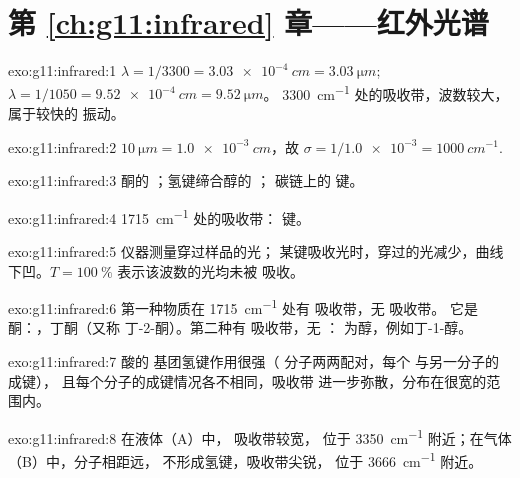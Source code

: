 \section*{第 \ref{ch:g11:infrared} 章——红外光谱}

\begin{solution}{exo:g11:infrared:1}
$\lambda = 1/3300 = \qty{3.03e-4}{cm} = \qty{3.03}{\micro m}$;
$\lambda = 1/1050 = \qty{9.52e-4}{cm} = \qty{9.52}{\micro m}$。
\qty{3300}{cm^{-1}} 处的吸收带，波数较大，属于较快的
振动。
\end{solution}

\begin{solution}{exo:g11:infrared:2}
$\qty{10}{\micro m} = \qty{1.0e-3}{cm}$，故 $\sigma = 1/\num{1.0e-3} =
\qty{1000}{cm^{-1}}$.
\end{solution}

\begin{solution}{exo:g11:infrared:3}
酮的 ；氢键缔合醇的 ；
碳链上的  键。
\end{solution}

\begin{solution}{exo:g11:infrared:4}
\qty{1715}{cm^{-1}} 处的吸收带： 键。
\end{solution}

\begin{solution}{exo:g11:infrared:5}
仪器测量穿过样品的光；
某键吸收光时，穿过的光减少，曲线下凹。$T =
\qty{100}{\percent}$ 表示该波数的光均未被
吸收。
\end{solution}

\begin{solution}{exo:g11:infrared:6}
第一种物质在 \qty{1715}{cm^{-1}} 处有  吸收带，无  吸收带。
它是酮：，丁酮（又称
丁-2-酮）。第二种有  吸收带，无 ：
为醇，例如丁-1-醇。
\end{solution}

\begin{solution}{exo:g11:infrared:7}
酸的  基团氢键作用很强（
分子两两配对，每个  与另一分子的  成键），
且每个分子的成键情况各不相同，吸收带
进一步弥散，分布在很宽的范围内。
\end{solution}

\begin{solution}{exo:g11:infrared:8}
在液体（A）中， 吸收带较宽，
位于 \qty{3350}{cm^{-1}} 附近；在气体（B）中，分子相距远，
不形成氢键，吸收带尖锐，
位于 \qty{3666}{cm^{-1}} 附近。
\end{solution}

